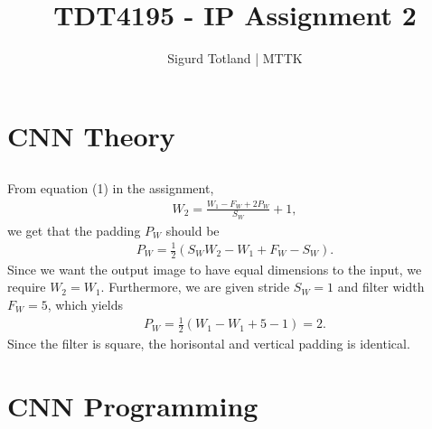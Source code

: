 \documentclass[]{article}
\title{TDT4195 - IP Assignment 2}
\author{Sigurd Totland | MTTK}
\begin{document}
\maketitle

\section{CNN Theory}
\subsection{}
From equation (1) in the assignment,
\begin{equation}\begin{aligned}
W_2 = \frac{W_1 - F_W + 2 P_W}{S_W} + 1,
\end{aligned}\end{equation}
we get that the padding $P_W$ should be
\begin{equation}\begin{aligned}
P_W = \frac{1}{2}(S_W W_2 - W_1 + F_W - S_W).
\end{aligned}\end{equation}
Since we want the output image to have equal dimensions to the input, we require $W_2 = W_1$. Furthermore, we are given stride $S_W = 1$ and filter width $F_W = 5$, which yields
\begin{equation}\begin{aligned}
P_W = \frac{1}{2}(W_1 - W_1 + 5 - 1) = 2.
\end{aligned}\end{equation}
Since the filter is square, the horisontal and vertical padding is identical.

\section{CNN Programming}
\end{document}
